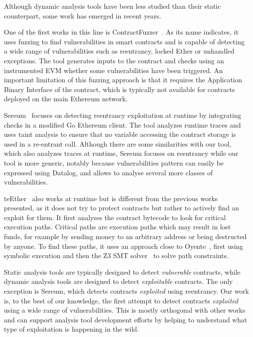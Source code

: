  Although dynamic analysis tools have been less studied than their static counterpart, some work has emerged in recent years.

One of the first works in this line is ContractFuzzer~\cite{Jiang2018}.
As its name indicates, it uses fuzzing to find vulnerabilities in smart contracts and is capable of detecting a wide range of vulnerabilities such as reentrancy, locked Ether or unhandled exceptions.
The tool generates inputs to the contract and checks using an instrumented EVM whether some vulnerabilities have been triggered.
An important limitation of this fuzzing approach is that it requires the Application Binary Interface of the contract, which is typically not available for contracts deployed on the main Ethereum network.

Sereum~\cite{Rodler2019} focuses on detecting reentrancy exploitation at runtime by integrating checks in a modified Go Ethereum client.
The tool analyzes runtime traces and uses taint analysis to ensure that no variable accessing the contract storage is used in a re-entrant call.
Although there are some similarities with our tool, which also analyzes traces at runtime, Sereum focuses on reentrancy while our tool is more generic, notably because vulnerabilities pattern can easily be expressed using Datalog, and allows to analyse several more classes of vulnerabilities.

teEther~\cite{Krupp2018} also works at runtime but is different from the previous works presented, as it does not try to protect contracts but rather to actively find an exploit for them. It first analyses the contract bytecode to look for critical execution paths.
Critical paths are execution paths which may result in lost funds, for example by sending money to an arbitrary address or being destructed by anyone.
To find these paths, it uses an approach close to Oyente~\cite{luu2016a}, first using symbolic execution and then the Z3 SMT solver~\cite{de2008z3} to solve path constraints.

 Static analysis tools are typically designed to detect \emph{vulnerable} contracts, while dynamic analysis tools are designed to detect \emph{exploitable} contracts. The only exception is Sereum, which detects contracts \emph{exploited} using reentrancy.
Our work is, to the best of our knowledge, the first attempt to detect contracts \emph{exploited} using a wide range of vulnerabilities.
This is mostly orthogonal with other works and can support analysis tool development efforts by helping to understand what type of exploitation is happening in the wild.

